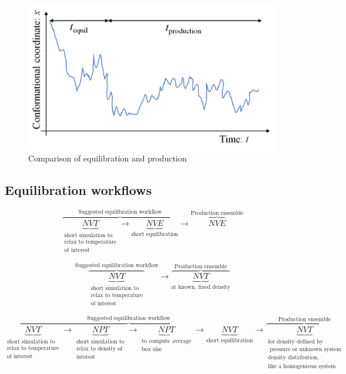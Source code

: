 	\begin{figure}[H]
		\includegraphics[width = \textwidth]{equilibration-production}
		\caption{Comparison of equilibration and production}
		\label{fig:equilibration-production}
	\end{figure}

	\subsection{Equilibration workflows}

	$$\overbrace{\underbrace{NVT}_{\substack{\text{short simulation to}\\\text{relax to temperature}\\\text{of interest}}}\rightarrow \underbrace{NVE}_{\text{short equilibration}}}^{\text{Suggested equilibration workflow}}\rightarrow \overbrace{NVE}^{\text{Production ensemble}}$$

	$$\overbrace{\underbrace{NVT}_{\substack{\text{short simulation to}\\\text{relax to temperature}\\\text{of interest}}}}^{\text{Suggested equilibration workflow}}\rightarrow \overbrace{\underbrace{NVT}_{\text{at known, fixed density}}}^{\text{Production ensemble}}$$

			$$\overbrace{\underbrace{NVT}_{\substack{\text{short simulation to}\\\text{relax to temperature}\\\text{of interest}}}\rightarrow \underbrace{NPT}_{\substack{\text{short simulation to}\\\text{relax to density of}\\\text{interest}}}\rightarrow\underbrace{NPT}_{\substack{\text{to compute average}\\\text{box size}}}\rightarrow \underbrace{NVT}_{\text{short equilibration}}}^{\text{Suggested equilibration workflow}}\rightarrow\overbrace{\underbrace{NVT}_{\substack{\text{for density defined by}\\\text{ pressure or unknown system}\\\text{density distribution,}\\\text{like a homogeneous system}}}}^{\text{Production ensemble}}$$


